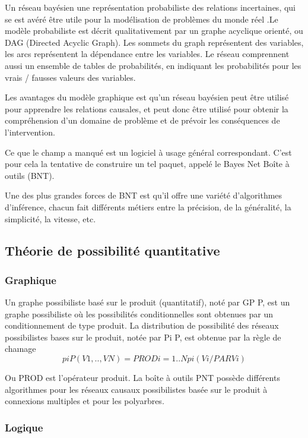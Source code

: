 Un réseau bayésien une représentation probabiliste des relations incertaines, qui se est avéré être utile pour la modélisation de problèmes du monde réel .Le modèle probabiliste est décrit qualitativement par un graphe acyclique orienté, ou DAG (Directed Acyclic Graph). Les sommets du graph représentent des variables, les arcs représentent la dépendance entre les variables. Le réseau comprennent aussi un ensemble de tables de probabilités, en indiquant les probabilités pour les vrais / fausses valeurs des variables.

Les avantages du  modèle graphique est qu’un réseau bayésien peut être utilisé pour apprendre les relations causales, et peut donc être utilisé pour obtenir la compréhension d'un domaine de problème et de prévoir les conséquences de l'intervention.

Ce que le champ a manqué est un logiciel à usage général correspondant. C’est pour cela la tentative de construire un tel paquet, appelé le Bayes Net Boîte à outils (BNT).

Une des plus grandes forces de BNT est qu'il offre une variété d'algorithmes d'inférence, chacun fait différents métiers entre la précision, de la généralité, la simplicité, la vitesse, etc.


\subsection{Théorie de possibilité quantitative}

\subsubsection{Graphique}

Un graphe possibiliste basé sur le produit (quantitatif), noté par GP P, est un graphe possibiliste où les possibilités conditionnelles sont obtenues par un conditionnement de type produit. La distribution de possibilité des réseaux possibilistes bases sur le produit, notée par Pi P, est obtenue par la règle de chaınage 
\begin{equation}
pi P (V1, .., VN) = PRODi=1..N pi (Vi/PARVi)
\end{equation}

 	
Ou PROD est l’opérateur produit.
La boîte à outils PNT possède différents algorithmes pour les réseaux causaux possibilistes basée sur le produit à connexions multiples et pour les polyarbres. 
\subsubsection{Logique}

